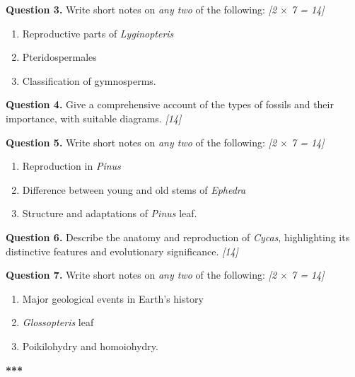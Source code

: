 \documentclass[11pt,a4paper]{article}
\newcommand{\pts}[1]{\hfill \textit{[#1]}}
\begin{document}
\noindent \textbf{Question 3.} Write short notes on \textit{any two} of the following: \pts{2 $\times$ 7 = 14}
\begin{enumerate}[label=(\alph*)]
  \item Reproductive parts of \textit{Lyginopteris}
  \item Pteridospermales
  \item Classification of gymnosperms.
\end{enumerate}

\bigskip

\noindent \textbf{Question 4.} Give a comprehensive account of the types of fossils and their importance, with suitable diagrams. \pts{14}

\bigskip

\noindent \textbf{Question 5.} Write short notes on \textit{any two} of the following: \pts{2 $\times$ 7 = 14}
\begin{enumerate}[label=(\alph*)]
  \item Reproduction in \textit{Pinus}
  \item Difference between young and old stems of \textit{Ephedra}
  \item Structure and adaptations of \textit{Pinus} leaf.
\end{enumerate}

\bigskip

\noindent \textbf{Question 6.} Describe the anatomy and reproduction of \textit{Cycas}, highlighting its distinctive features and evolutionary significance. \pts{14}

\bigskip

\noindent \textbf{Question 7.} Write short notes on \textit{any two} of the following: \pts{2 $\times$ 7 = 14}
\begin{enumerate}[label=(\alph*)]
  \item Major geological events in Earth's history
  \item \textit{Glossopteris} leaf
  \item Poikilohydry and homoiohydry.
\end{enumerate}

\bigskip
\begin{center}
  \textbf{***}
\end{center}
\end{document}
